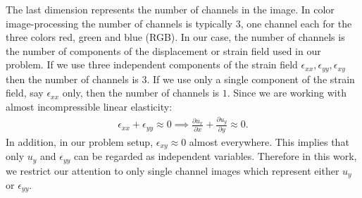 \documentclass[12pt]{article}
\newcommand{\pdd}[2]{\frac{\partial{{#1}}}{\partial{#2}}}
\begin{document}
The last dimension represents the number of channels in the image. In color image-processing the number of channels is typically $3$, one channel each for the three colors red, green and blue (RGB). In our case, the number of channels is the number of components of the displacement or strain field used in our problem. If we use three independent components of the strain field $\epsilon_{xx},\epsilon_{yy},\epsilon_{xy}$ then the number of channels is $3$. If we use only a single component of the strain field, say $\epsilon_{xx}$ only, then the number of channels is $1$.
Since we are working with almost incompressible linear elasticity:
\begin{align}
  \epsilon_{xx}+\epsilon_{yy}\approx{0} \implies \pdd{u_x}{x} + \pdd{u_y}{y} \approx{0}.
\end{align}
In addition, in our problem setup, $\epsilon_{xy}\approx{0}$ almost everywhere. This implies that only $u_y$ and $\epsilon_{yy}$ can be regarded as independent variables. Therefore in this work, we restrict our attention to only single channel images which represent either $u_y$ or $\epsilon_{yy}$.
\end{document}
